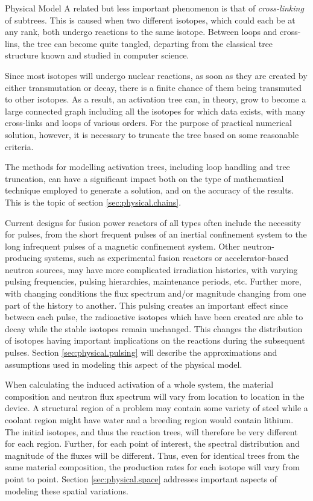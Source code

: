 \begin{chapter}{Physical Model\label{chap:physical}}
A related but less important phenomenon is that of
\textsl{cross-linking} of subtrees.  This is caused when two different
isotopes, which could each be at any rank, both undergo reactions to
the same isotope.  Between loops and cross-lins, the tree can become
quite tangled, departing from the classical tree structure known and
studied in computer science.

Since most isotopes will undergo nuclear reactions, as soon as they
are created by either transmutation or decay, there is a finite chance
of them being transmuted to other isotopes.  As a result, an
activation tree can, in theory, grow to become a large connected graph
including all the isotopes for which data exists, with many
cross-links and loops of various orders.  For the purpose of practical
numerical solution, however, it is necessary to truncate the tree
based on some reasonable criteria.

The methods for modelling activation trees, including loop handling
and tree truncation, can have a significant impact both on the type of
mathematical technique employed to generate a solution, and on the
accuracy of the results.  This is the topic of section
\ref{sec:physical.chains}.

Current designs for fusion power reactors of all types often include
the necessity for pulses, from the short frequent pulses of an
inertial confinement system to the long infrequent pulses of a
magnetic confinement system.  Other neutron-producing systems, such as
experimental fusion reactors or accelerator-based neutron sources, may
have more complicated irradiation histories, with varying pulsing
frequencies, pulsing hierarchies, maintenance periods, etc.  Further
more, with changing conditions the flux spectrum and/or magnitude
changing from one part of the history to another.  This pulsing
creates an important
effect\cite{ref:Pulsar,ref:spangler,ref:spanglerMS} since between each
pulse, the radioactive isotopes which have been created are able to
decay while the stable isotopes remain unchanged.  This changes the
distribution of isotopes having important implications on the
reactions during the subsequent pulses.  Section
\ref{sec:physical.pulsing} will describe the approximations and
assumptions used in modeling this aspect of the physical model.

When calculating the induced activation of a whole system, the
material composition and neutron flux spectrum will vary from location
to location in the device.  A structural region of a problem may
contain some variety of steel while a coolant region might have water
and a breeding region would contain lithium.  The initial isotopes,
and thus the reaction trees, will therefore be very different for each
region.  Further, for each point of interest, the spectral
distribution and magnitude of the fluxes will be different.  Thus,
even for identical trees from the same material composition, the
production rates for each isotope will vary from point to point.
Section \ref{sec:physical.space} addresses important aspects of
modeling these spatial variations.


\end{chapter}
